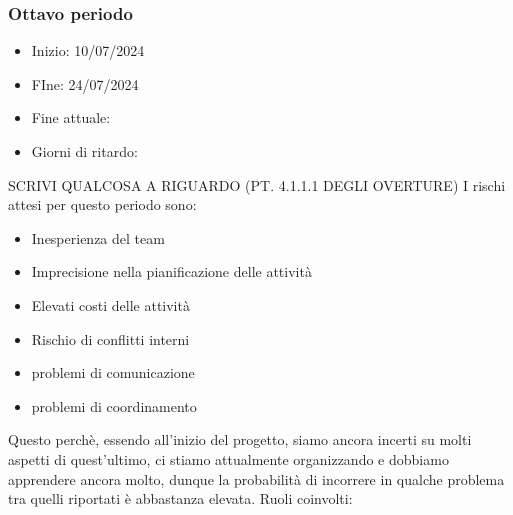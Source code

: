     \subsubsection{Ottavo periodo}
    \begin{itemize}
        \item Inizio: 10/07/2024
        \item FIne: 24/07/2024
        \item Fine attuale:
        \item Giorni di ritardo:
    \end{itemize}
    SCRIVI QUALCOSA A RIGUARDO (PT. 4.1.1.1 DEGLI OVERTURE)
    I rischi attesi per questo periodo sono:
    \begin{itemize}
        \item Inesperienza del team
        \item Imprecisione nella pianificazione delle attività
        \item Elevati costi delle attività
        \item Rischio di conflitti interni 
        \item problemi di comunicazione
        \item problemi di coordinamento
    \end{itemize}
    Questo perchè, essendo all’inizio del progetto, siamo ancora incerti su molti aspetti di quest’ultimo, ci stiamo attualmente organizzando e dobbiamo apprendere ancora molto, dunque la probabilità di incorrere in qualche problema tra quelli riportati è abbastanza elevata.
    Ruoli coinvolti: 



